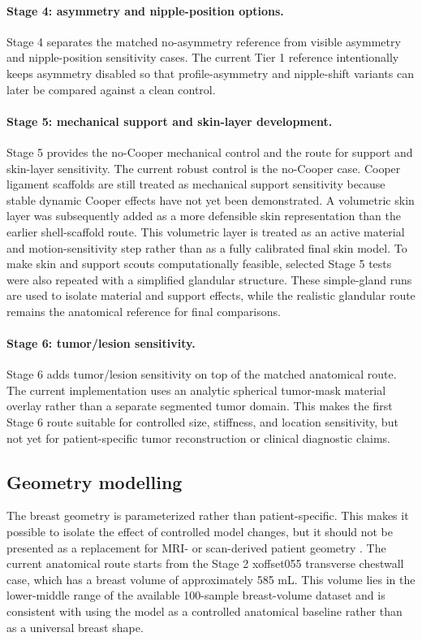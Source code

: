 \paragraph{Stage 4: asymmetry and nipple-position options.}
Stage 4 separates the matched no-asymmetry reference from visible asymmetry and nipple-position sensitivity cases. The current Tier 1 reference intentionally keeps asymmetry disabled so that profile-asymmetry and nipple-shift variants can later be compared against a clean control.

\paragraph{Stage 5: mechanical support and skin-layer development.}
Stage 5 provides the no-Cooper mechanical control and the route for support and skin-layer sensitivity. The current robust control is the no-Cooper case. Cooper ligament scaffolds are still treated as mechanical support sensitivity because stable dynamic Cooper effects have not yet been demonstrated. A volumetric skin layer was subsequently added as a more defensible skin representation than the earlier shell-scaffold route. This volumetric layer is treated as an active material and motion-sensitivity step rather than as a fully calibrated final skin model. To make skin and support scouts computationally feasible, selected Stage 5 tests were also repeated with a simplified glandular structure. These simple-gland runs are used to isolate material and support effects, while the realistic glandular route remains the anatomical reference for final comparisons.

\paragraph{Stage 6: tumor/lesion sensitivity.}
Stage 6 adds tumor/lesion sensitivity on top of the matched anatomical route. The current implementation uses an analytic spherical tumor-mask material overlay rather than a separate segmented tumor domain. This makes the first Stage 6 route suitable for controlled size, stiffness, and location sensitivity, but not yet for patient-specific tumor reconstruction or clinical diagnostic claims.

\subsection{Geometry modelling}

The breast geometry is parameterized rather than patient-specific. This makes it possible to isolate the effect of controlled model changes, but it should not be presented as a replacement for MRI- or scan-derived patient geometry \cite{Samani2001,Hsu2011,Mazier2024}. The current anatomical route starts from the Stage 2 xoffset055 transverse chestwall case, which has a breast volume of approximately 585 mL. This volume lies in the lower-middle range of the available 100-sample breast-volume dataset and is consistent with using the model as a controlled anatomical baseline rather than as a universal breast shape.

